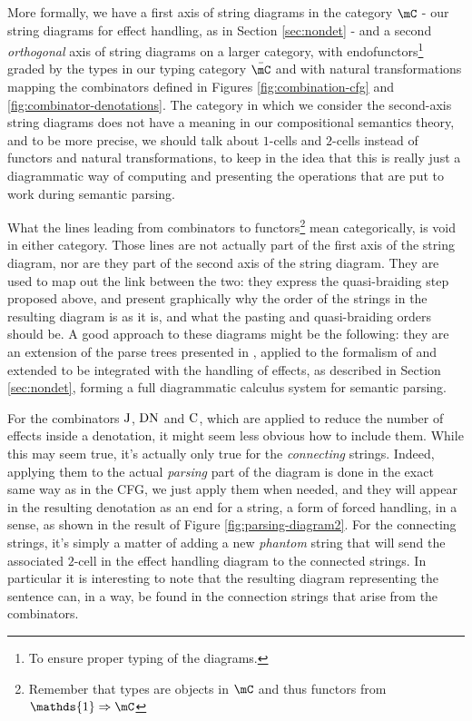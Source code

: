 More formally, we have a first axis of string diagrams in the category
$\mC$ - our string diagrams for effect handling, as in Section
\ref{sec:nondet} - and a second \emph{orthogonal} axis of string diagrams
on a larger category, with endofunctors\footnote{To ensure proper typing of the
	diagrams.} graded by the types in our typing category $\bar{\mC}$ and
with natural transformations mapping the combinators defined in Figures
\ref{fig:combination-cfg} and \ref{fig:combinator-denotations}.
The category in which we consider the second-axis string diagrams does not have
a meaning in our compositional semantics theory, and to be more precise, we
should talk about $1$-cells and $2$-cells instead of functors and natural
transformations, to keep in the idea that this is really just a diagrammatic
way of computing and presenting the operations that are put to work during
semantic parsing.

\medskip

What the lines leading from combinators to functors\footnote{Remember that
	types are objects in $\mC$ and thus functors from
	$\mathds{1} \Rightarrow \mC$} mean categorically, is void in either category.
Those lines are not actually part of the first axis of the string diagram,
nor are they part of the second axis of the string diagram.
They are used to map out the link between the two: they express the
quasi-braiding step proposed above, and present graphically why the order of
the strings in the resulting diagram is as it is, and what the pasting and
quasi-braiding orders should be.
A good approach to these diagrams might be the following: they are an extension
of the parse trees presented in
, applied to the
formalism of  and
extended to be integrated with the handling of effects,
as described in Section \ref{sec:nondet}, forming a full diagrammatic calculus
system for semantic parsing.

\medskip

For the combinators $\text{J}$, $\text{DN}$ and $\text{C}$, which are applied to
reduce the number of effects inside a denotation, it might seem less obvious
how to include them.
While this may seem true, it's actually only true for the \emph{connecting}
strings.
Indeed, applying them to the actual \emph{parsing} part of the diagram is done
in the exact same way as in the CFG, we just apply them when needed, and they
will appear in the resulting denotation as an end for a string, a form of
forced handling, in a sense, as shown in the result of Figure
\ref{fig:parsing-diagram2}.
For the connecting strings, it's simply a matter of adding a new \emph{phantom}
string that will send the associated $2$-cell in the effect handling diagram to
the connected strings.
In particular it is interesting to note that the resulting diagram representing
the sentence can, in a way, be found in the connection strings that arise from
the combinators.

